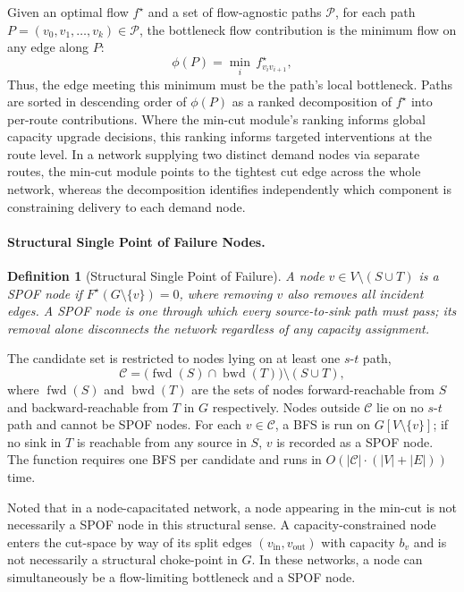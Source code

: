\documentclass[12pt]{report}
\newtheorem{definition}{Definition}
\begin{document}
Given an optimal flow $f^\star$ and a set of flow-agnostic paths $\mathcal{P}$, for each path $P = (v_0, v_1, \ldots, v_k) \in 
\mathcal{P}$, the bottleneck flow contribution is the minimum flow on any edge along $P$:
\[
\phi(P) = \min_{i}\, f^\star_{v_i v_{i+1}},
\]
 Thus, the edge meeting this minimum must be the path's local bottleneck. Paths are sorted in descending order of $\phi(P)$ as a ranked decomposition of $f^\star$ into per-route contributions. Where the min-cut module's ranking informs global capacity upgrade decisions, this ranking informs targeted interventions at the route level. In a network supplying two distinct demand nodes via separate routes, the min-cut module points to the tightest cut edge across the whole network, whereas the decomposition identifies independently which component is constraining delivery to each demand node.

\paragraph{Structural Single Point of Failure Nodes.} 

\begin{definition}[Structural Single Point of Failure] 
A node $v \in V \setminus (S \cup T)$ is a SPOF node if $F^\star(G \setminus \{v\}) = 0$, where removing $v$ also removes all incident edges. A SPOF node is one through which every source-to-sink path must pass; its removal alone disconnects the network regardless of any capacity assignment. 
\end{definition} 

The candidate set is restricted to nodes lying on at least one $s$-$t$ path,
\[
\mathcal{C} = \bigl(\operatorname{fwd}(S) \cap 
\operatorname{bwd}(T)\bigr) \setminus (S \cup T),
\]
where $\operatorname{fwd}(S)$ and $\operatorname{bwd}(T)$ are the sets of nodes forward-reachable from $S$ and backward-reachable from $T$ in $G$ respectively. Nodes outside $\mathcal{C}$ lie on no $s$-$t$ path and cannot be SPOF nodes. For each $v \in \mathcal{C}$, a BFS is run on $G[V \setminus \{v\}]$; if no sink in $T$ is reachable from any source in $S$, $v$ is recorded as a SPOF node. The function requires one BFS per candidate and runs in $O(|\mathcal{C}| \cdot (|V| + |E|))$ time. 

Noted that in a node-capacitated network, a node appearing in the min-cut is not necessarily a SPOF node in this structural sense. A capacity-constrained node enters the cut-space by way of its split edges $(v_{\text{in}}, v_{\text{out}})$ with capacity $b_v$ and is not necessarily a structural choke-point in $G$. In these networks, a node 
can simultaneously be a flow-limiting bottleneck and a SPOF node.
\end{document}
